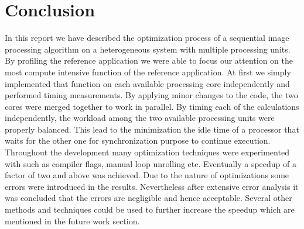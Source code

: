 \section{Conclusion}
\label{sec:Conclusion}
 In this report we have described the optimization process of a sequential image processing algorithm on a heterogeneous system with multiple processing units.
By profiling the reference application we were able to focus our attention on the most compute intensive function of the reference application.
At first we simply implemented that function on each available processing core independently and performed timing measurements. By applying minor changes to the code, the two cores were merged together to work in parallel.
By timing each of the calculations independently, the workload among the two available processing units were properly balanced.
This lead to the minimization the idle time of a processor that waits for the other one for synchronization purpose to continue execution.
Throughout the development many optimization techniques were experimented with such as compiler flags, manual loop unrolling etc.
Eventually a speedup of a factor of two and above was achieved. Due to the nature of optimizations some errors were introduced in the results. Nevertheless after extensive error analysis it was concluded that the errors are negligible and hence acceptable. Several other methods and techniques could be used to further increase the speedup which are mentioned in the future work section.